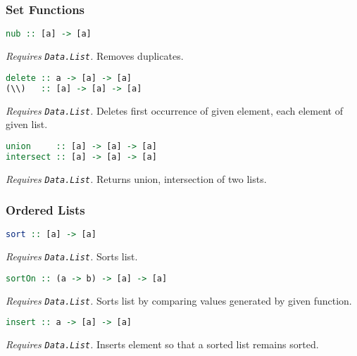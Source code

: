 \documentclass[twocolumn,english]{article}
\begin{document}
\subsubsection{Set Functions}

\begin{lstlisting}[language=Haskell,frame=single]
nub :: [a] -> [a]
\end{lstlisting}


\emph{Requires }\texttt{\emph{Data.List}}\emph{.} Removes duplicates.

\begin{lstlisting}[language=Haskell,frame=single]
delete :: a -> [a] -> [a]
(\\)   :: [a] -> [a] -> [a]
\end{lstlisting}


\emph{Requires }\texttt{\emph{Data.List}}\emph{.} Deletes first occurrence
of given element, each element of given list.

\begin{lstlisting}[language=Haskell,frame=single]
union     :: [a] -> [a] -> [a]
intersect :: [a] -> [a] -> [a]
\end{lstlisting}


\emph{Requires }\texttt{\emph{Data.List}}\emph{.} Returns union, intersection
of two lists.


\subsubsection{Ordered Lists}

\begin{lstlisting}[language=Haskell,frame=single]
sort :: [a] -> [a]
\end{lstlisting}


\emph{Requires }\texttt{\emph{Data.List}}\emph{.} Sorts list.

\begin{lstlisting}[language=Haskell,frame=single]
sortOn :: (a -> b) -> [a] -> [a]
\end{lstlisting}


\emph{Requires }\texttt{\emph{Data.List}}\emph{.} Sorts list by comparing
values generated by given function.

\begin{lstlisting}[language=Haskell,frame=single]
insert :: a -> [a] -> [a]
\end{lstlisting}


\emph{Requires }\texttt{\emph{Data.List}}\emph{.} Inserts element
so that a sorted list remains sorted.
\end{document}
